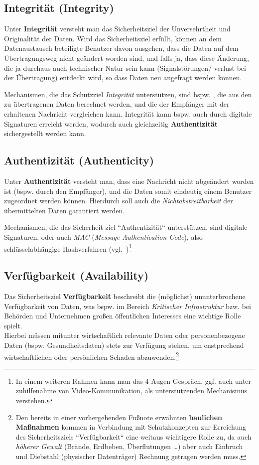 \subsection*{Integrität (Integrity)}
Unter \textbf{Integrität} versteht man das Sicherheitsziel der Unversehrtheit und Originalität der Daten.
Wird das Sicherheitsziel erfüllt, können an dem Datenaustausch beteiligte Benutzer davon ausgehen, dass die Daten auf dem Übertragungsweg nicht geändert worden sind, und falls ja, dass diese Änderung, die ja durchaus auch technischer Natur sein kann (Signalstörungen/-verlust bei der Übertragung) entdeckt wird, so dass Daten neu angefragt werden können.

\noindent
Mechanismen, die das Schutzziel \textit{Integrität} unterstützen, sind bspw. , die aus den zu übertragenen Daten berechnet werden, und die der Empfänger mit der erhaltenen Nachricht vergleichen kann.
Integrität kann bspw. auch durch digitale Signaturen erreicht werden, wodurch auch gleichzeitig \textbf{Authentizität} sichergestellt werden kann.

\subsection*{Authentizität (Authenticity)}
Unter \textbf{Authentizität} versteht man, dass eine Nachricht nicht abgeändert worden ist (bspw. durch den Empfänger), und die Daten somit eindeutig einem Benutzer zugeordnet werden können. Hierdurch soll auch die \textit{Nichtabstreitbarkeit} der übermittelten Daten garantiert werden.

\noindent
Mechanismen, die das Sicherheit ziel ``Authentizität`` unterstützen, sind digitale Signaturen, oder auch \textit{MAC} (\textit{Message Authentication Code}), also schlüsselabhängige Hashverfahren (vgl.~\cite{Sch15})\footnote{
In einem weiteren Rahmen kann man das 4-Augen-Gespräch, ggf. auch unter zuhilfenahme von Video-Kommunikation, als unterstützenden Mechanismus verstehen.}

\subsection*{Verfügbarkeit (Availability)}
Das Sicherheitsziel \textbf{Verfügbarkeit} beschreibt die (möglichst) ununterbrochene Verfügbarkeit von Daten, was bspw. im Bereich \textit{Kritischer Infrastruktur} bzw. bei Behörden und Unternehmen großen öffentlichen Interesses eine wichtige Rolle spielt.\\
Hierbei müssen mitunter wirtschaftlich relevante Daten oder personenbezogene Daten (bspw. Gesundheitsdaten) stets zur Verfügung stehen, um enstprechend wirtschaftlichen oder persönlichen Schaden abzuwenden.\footnote{
Den bereits in einer vorhergehenden Fußnote erwähnten \textbf{baulichen Maßnahmen} kommen in Verbindung mit Schutzkonzepten zur Erreichung des Sicherheitsziels ``Verfügbarkeit`` eine weitaus wichtigere Rolle zu, da auch \textit{höherer Gewalt} (Brände, Erdbeben, Überflutungen \ldots) aber auch Einbruch und Diebstahl (physischer Datenträger) Rechnung getragen werden muss.
}

